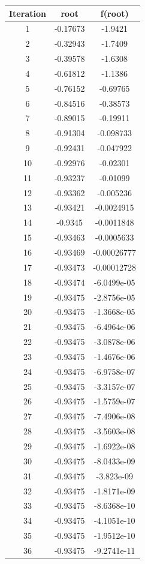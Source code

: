 \begin{center}
  \begin{tabular}{| c  c c |}
\hline
Iteration & root         & f(root) \\
\hline
1   &  -0.17673         &-1.9421 \\
\hline
2   &  -0.32943         &-1.7409 \\
\hline
3    & -0.39578         &-1.6308 \\
\hline
4     &-0.61812         &-1.1386 \\
\hline
5     &-0.76152        &-0.69765 \\
\hline
6     &-0.84516        &-0.38573 \\
\hline
7     &-0.89015        &-0.19911 \\
\hline
8     &-0.91304       &-0.098733 \\
\hline
9    & -0.92431       &-0.047922 \\
\hline
10    & -0.92976       & -0.02301 \\
\hline
11     &-0.93237       & -0.01099 \\
\hline
12     &-0.93362       &-0.005236 \\
\hline
13     &-0.93421      &-0.0024915 \\
\hline
14      &-0.9345      &-0.0011848 \\
\hline
15     &-0.93463      &-0.0005633 \\
\hline
16     &-0.93469     &-0.00026777 \\
\hline
17     &-0.93473     &-0.00012728 \\
\hline
18     &-0.93474     &-6.0499e-05 \\
\hline
19     &-0.93475     &-2.8756e-05 \\
\hline
20     &-0.93475    & -1.3668e-05 \\
\hline
21     &-0.93475    & -6.4964e-06 \\
\hline
22     &-0.93475    & -3.0878e-06 \\
\hline
23     &-0.93475    & -1.4676e-06 \\
\hline
24     &-0.93475    & -6.9758e-07 \\
\hline
25     &-0.93475    & -3.3157e-07 \\
\hline
26     &-0.93475    & -1.5759e-07 \\
\hline
27     &-0.93475    & -7.4906e-08 \\
\hline
28     &-0.93475    & -3.5603e-08 \\
\hline
29     &-0.93475    & -1.6922e-08 \\
\hline
30     &-0.93475    & -8.0433e-09 \\
\hline
31     &-0.93475    &  -3.823e-09 \\
\hline
32     &-0.93475    & -1.8171e-09 \\
\hline
33     &-0.93475    & -8.6368e-10 \\
\hline
34     &-0.93475    & -4.1051e-10 \\
\hline
35     &-0.93475    & -1.9512e-10 \\
\hline
36     &-0.93475    & -9.2741e-11 \\
\hline
\end{tabular}
\end{center}

